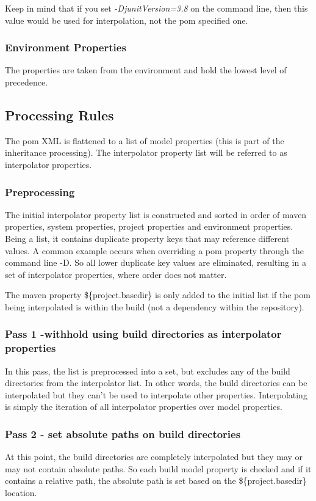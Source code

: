 \documentclass[12pt]{amsart}
\begin{document}
Keep in mind that if you set  \emph{-DjunitVersion=3.8} on the command line, then this value would be used for interpolation, not the pom specified one.

\subsubsection{Environment Properties}
The properties are taken from the environment and hold the lowest level of precedence.

\subsection{Processing Rules}
The pom XML is flattened to a list of model properties (this is part of the inheritance processing). The interpolator property list will be referred to as interpolator properties.
 
\subsubsection{Preprocessing}
The initial interpolator property list is constructed and sorted in order of maven properties, system properties, project properties and environment properties. Being a list, it contains duplicate property keys that may reference different values. A common example occurs when overriding a pom property through the command line -D. So all lower duplicate key values are eliminated, resulting in a set of interpolator properties, where order does not matter.

The maven property \$\{project.basedir\} is only added to the initial list if the pom being interpolated is within the build (not a dependency within the repository).

\subsubsection{Pass 1 -withhold using build directories as interpolator properties} In this pass, the list is preprocessed into a set, but excludes  any of the build directories from the interpolator list. In other words, the build directories can be interpolated but they can't be used to interpolate other properties. Interpolating is simply the iteration of all interpolator properties over model properties.

\subsubsection{Pass 2 - set absolute paths on build directories} At this point, the build directories are completely interpolated but they may or may not contain absolute paths. So each build model property is checked and if it contains a relative path, the absolute path is set based on the \$\{project.basedir\} location.
\end{document}
